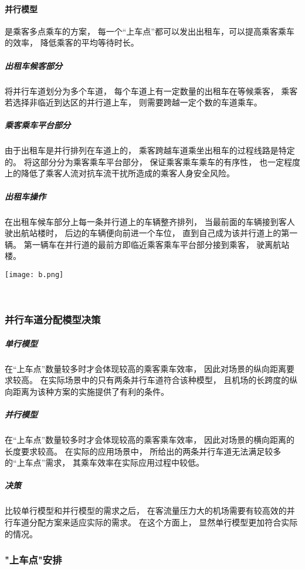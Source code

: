 \documentclass[withoutpreface,bwprint]{cumcmthesis} %
\begin{document}
\paragraph{并行模型}
是乘客多点乘车的方案， 每一个“上车点”都可以发出出租车，可以提高乘客乘车的效率， 降低乘客的平均等待时长。
\subparagraph{出租车候客部分}
将并行车道划分为多个车道， 每个车道上有一定数量的出租车在等候乘客， 乘客若选择非临近到达区的并行道上车， 则需要跨越一定个数的车道乘车。
\subparagraph{乘客乘车平台部分}
由于出租车是并行排列在车道上的， 乘客跨越车道乘坐出租车的过程线路是特定的。 将这部分分为乘客乘车平台部分， 保证乘客乘车乘车的有序性， 也一定程度上的降低了乘客人流对抗车流干扰所造成的乘客人身安全风险。
\subparagraph{出租车操作}
在出租车候车部分上每一条并行道上的车辆整齐排列， 当最前面的车辆接到客人驶出航站楼时， 后边的车辆便向前进一个车位， 直到自己成为该并行道上的第一辆。 第一辆车在并行道的最前方即临近乘客乘车平台部分接到乘客， 驶离航站楼。
\begin{center}
	\texttt{[image: b.png]}
\end{center}
\

\subsubsection{并行车道分配模型决策}
\subparagraph{单行模型}
在“上车点”数量较多时才会体现较高的乘客乘车效率， 因此对场景的纵向距离要求较高。 在实际场景中的只有两条并行车道符合该种模型， 且机场的长跨度的纵向距离为该种方案的实施提供了有利的条件。
\subparagraph{并行模型}
在“上车点”数量较多时才会体现较高的乘客乘车效率， 因此对场景的横向距离的长度要求较高。 在实际的应用场景中， 所给出的两条并行车道无法满足较多的“上车点”需求， 其乘车效率在实际应用过程中较低。
\subparagraph{决策}
比较单行模型和并行模型的需求之后， 在客流量压力大的机场需要有较高效的并行车道分配方案来适应实际的需求。 在这个方面上， 显然单行模型更加符合实际的情况。


\subsubsection{"上车点"安排}
\end{document}
